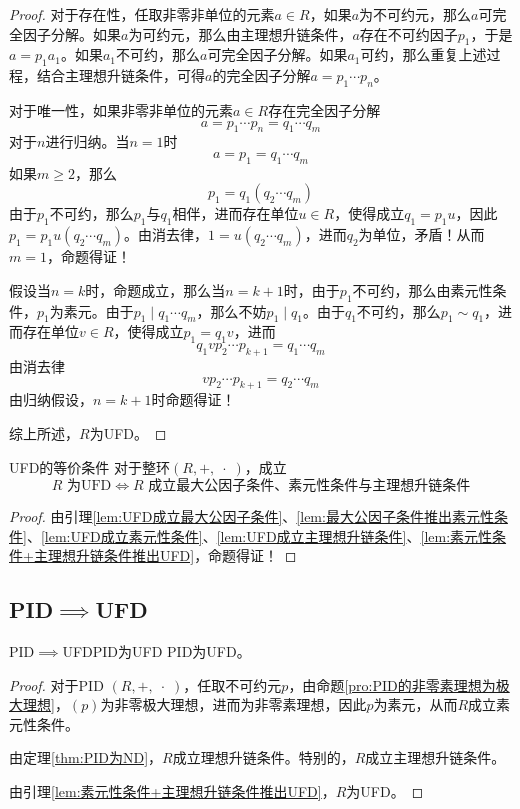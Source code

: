 \begin{proof}
	对于存在性，任取非零非单位的元素$a\in R$，如果$a$为不可约元，那么$a$可完全因子分解。如果$a$为可约元，那么由主理想升链条件，$a$存在不可约因子$p_1$，于是$a=p_1a_1$。如果$a_1$不可约，那么$a$可完全因子分解。如果$a_1$可约，那么重复上述过程，结合主理想升链条件，可得$a$的完全因子分解$a=p_1\cdots p_n$。
	
	对于唯一性，如果非零非单位的元素$a\in R$存在完全因子分解
	$$
	a=p_1\cdots p_n=q_1\cdots q_m
	$$
	对于$n$进行归纳。当$n=1$时
	$$
	a=p_1=q_1\cdots q_m
	$$
	如果$m\ge 2$，那么
	$$
	p_1=q_1(q_2\cdots q_m)
	$$
	由于$p_1$不可约，那么$p_1$与$q_1$相伴，进而存在单位$u\in R$，使得成立$q_1=p_1u$，因此$p_1=p_1u(q_2\cdots q_m)$。由消去律，$1=u(q_2\cdots q_m)$，进而$q_2$为单位，矛盾！从而$m=1$，命题得证！
	
	假设当$n=k$时，命题成立，那么当$n=k+1$时，由于$p_1$不可约，那么由素元性条件，$p_1$为素元。由于$p_1\mid q_1\cdots q_m$，那么不妨$p_1\mid q_1$。由于$q_1$不可约，那么$p_1\sim q_1$，进而存在单位$v\in R$，使得成立$p_1=q_1v$，进而
	$$
	q_1vp_2\cdots p_{k+1}=q_1\cdots q_m
	$$
	由消去律
	$$
	vp_2\cdots p_{k+1}=q_2\cdots q_m
	$$
	由归纳假设，$n=k+1$时命题得证！
	
	综上所述，$R$为UFD。
\end{proof}

\begin{theorem}{UFD的等价条件}
	对于整环$(R,+,\;\cdot\;)$，成立
	$$
	R \text{ 为UFD}
	\iff
	R \text{ 成立最大公因子条件、素元性条件与主理想升链条件}
	$$
\end{theorem}

\begin{proof}
	由引理\ref{lem:UFD成立最大公因子条件}、\ref{lem:最大公因子条件推出素元性条件}、\ref{lem:UFD成立素元性条件}、\ref{lem:UFD成立主理想升链条件}、\ref{lem:素元性条件+主理想升链条件推出UFD}，命题得证！
\end{proof}

\subsection{PID$\implies$UFD}

\begin{theorem}{PID$\implies$UFD}{PID为UFD}
	PID为UFD。
\end{theorem}

\begin{proof}
	对于PID $(R,+,\;\cdot\;)$，任取不可约元$p$，由命题\ref{pro:PID的非零素理想为极大理想}，$(p)$为非零极大理想，进而为非零素理想，因此$p$为素元，从而$R$成立素元性条件。
	
	由定理\ref{thm:PID为ND}，$R$成立理想升链条件。特别的，$R$成立主理想升链条件。
	
	由引理\ref{lem:素元性条件+主理想升链条件推出UFD}，$R$为UFD。
\end{proof}

